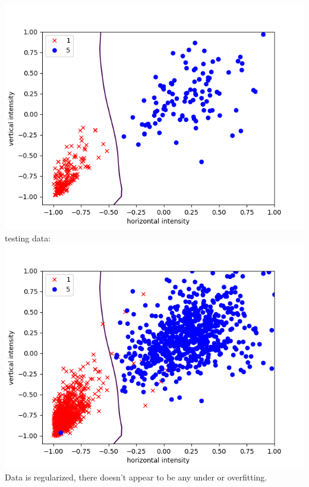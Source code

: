 \documentclass{article}
\begin{document}
\begin{enumerate}
        \includegraphics[scale=0.5]{images/reg2train.png}\\
        testing data:\\
        \includegraphics[scale=0.5]{images/reg2test.png}\\
        Data is regularized, there doesn't appear to be any under or overfitting.
    \end{enumerate}
\end{document}
